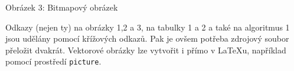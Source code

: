 \documentclass[11pt]{article}
\begin{document}
    \begin{center}
        Obrázek 3: Bitmapový obrázek
    \end{center}



    Odkazy (nejen ty) na obrázky 1,2 a 3, na tabulky 1 a 2 a také na algoritmus 1 jsou udělány pomocí křížových odkazů.
    Pak je ovšem potřeba zdrojový soubor přeložit dvakrát.
    Vektorové obrázky lze vytvořit i přímo v \LaTeX u, například pomocí prostředí \verb|picture|.


\end{document}
